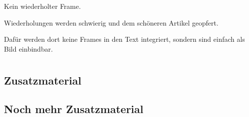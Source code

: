 	\begin{frame}{Kein wiederholter Frame.}

		Wiederholungen werden schwierig und dem schöneren Artikel geopfert.

		Dafür werden dort keine Frames in den Text integriert, sondern sind einfach als Bild einbindbar.

	\end{frame}







	\appendix

	\section{\appendixname}

	\frame{\tableofcontents}

	\subsection{Zusatzmaterial}


	\subsection{Noch mehr Zusatzmaterial}





